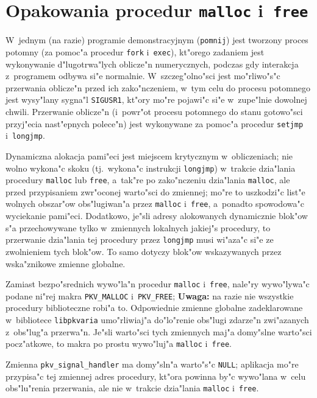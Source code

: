 \newpage
\section{Opakowania procedur \texttt{malloc} i~\texttt{free}}

W~jednym (na razie) programie demonstracyjnym (\texttt{pomnij})
jest tworzony proces potomny
(za pomoc"a procedur \texttt{fork} i~\texttt{exec}), kt"orego zadaniem
jest wykonywanie d"lugotrwa"lych oblicze"n numerycznych, podczas
gdy interakcja z~programem odbywa si"e normalnie. W~szczeg"olno"sci
jest mo"rliwo"s"c przerwania oblicze"n przed ich zako"nczeniem,
w~tym celu do procesu potomnego jest wysy"lany sygna"l \texttt{SIGUSR1},
kt"ory mo"re pojawi"c si"e w~zupe"lnie dowolnej chwili.
Przerwanie oblicze"n (i~powr"ot procesu potomnego do stanu
gotowo"sci przyj"ecia nast"epnych polece"n) jest wykonywane za
pomoc"a procedur \texttt{setjmp} i~\texttt{longjmp}.

Dynamiczna alokacja pami"eci jest miejscem krytycznym w~obliczeniach;
nie wolno wykona"c skoku (tj.\ wykona"c instrukcji \texttt{longjmp})
w~trakcie dzia"lania procedury \texttt{malloc} lub \texttt{free},
a~tak"re po zako"nczeniu dzia"lania \texttt{malloc}, ale przed przypisaniem
zwr"oconej warto"sci do zmiennej; mo"re to uszkodzi"c list"e wolnych
obszar"ow obs"lugiwan"a przez \texttt{malloc} i~\texttt{free},
a~ponadto spowodowa"c wyciekanie pami"eci. Dodatkowo, je"sli adresy
alokowanych dynamicznie blok"ow s"a przechowywane tylko w~zmiennych
lokalnych jakiej"s procedury, to przerwanie dzia"lania tej procedury przez
\texttt{longjmp} musi wi"aza"c si"e ze zwolnieniem tych blok"ow.
To samo dotyczy blok"ow wskazywanych przez wska"znikowe zmienne
globalne.

Zamiast bezpo"srednich wywo"la"n procedur \texttt{malloc} i~\texttt{free},
nale"ry wywo"lywa"c podane ni"rej makra \texttt{PKV\_MALLOC}
i~\texttt{PKV\_FREE}; \textbf{Uwaga:} na razie nie wszystkie procedury
biblioteczne robi"a to. Odpowiednie zmienne globalne zadeklarowane
w~bibliotece \texttt{libpkvaria} umo"rliwiaj"a do"lo"renie obs"lugi
zdarze"n zwi"azanych z~obs"lug"a przerwa"n. Je"sli warto"sci tych
zmiennych maj"a domy"slne warto"sci pocz"atkowe, to makra
po prostu wywo"luj"a \texttt{malloc} i~\texttt{free}.

\vspace{\bigskipamount}
Zmienna \texttt{pkv\_signal\_handler} ma domy"sln"a warto"s"c \texttt{NULL};
aplikacja mo"re przypisa"c tej zmiennej adres procedury, kt"ora
powinna by"c wywo"lana w~celu obs"lu"renia przerwania, ale nie
w~trakcie dzia"lania \texttt{malloc} i~\texttt{free}.

